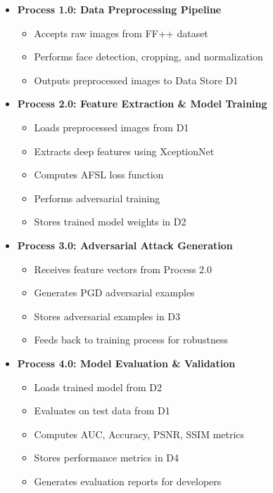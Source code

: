 \documentclass[a4paper,12pt]{article}
\begin{document}
\begin{itemize}
    \item \textbf{Process 1.0: Data Preprocessing Pipeline}
    \begin{itemize}
        \item Accepts raw images from FF++ dataset
        \item Performs face detection, cropping, and normalization
        \item Outputs preprocessed images to Data Store D1
    \end{itemize}
    
    \item \textbf{Process 2.0: Feature Extraction \& Model Training}
    \begin{itemize}
        \item Loads preprocessed images from D1
        \item Extracts deep features using XceptionNet
        \item Computes AFSL loss function
        \item Performs adversarial training
        \item Stores trained model weights in D2
    \end{itemize}
    
    \item \textbf{Process 3.0: Adversarial Attack Generation}
    \begin{itemize}
        \item Receives feature vectors from Process 2.0
        \item Generates PGD adversarial examples
        \item Stores adversarial examples in D3
        \item Feeds back to training process for robustness
    \end{itemize}
    
    \item \textbf{Process 4.0: Model Evaluation \& Validation}
    \begin{itemize}
        \item Loads trained model from D2
        \item Evaluates on test data from D1
        \item Computes AUC, Accuracy, PSNR, SSIM metrics
        \item Stores performance metrics in D4
        \item Generates evaluation reports for developers
    \end{itemize}
    

\end{itemize}
\end{document}
